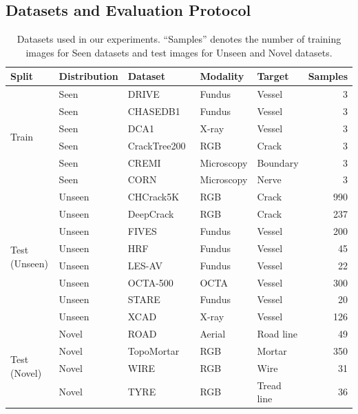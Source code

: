 \subsection{Datasets and Evaluation Protocol}
\label{sec:datasets}

\begin{table}[t]
\centering
\caption{Datasets used in our experiments.  ``Samples'' denotes the number
of training images for Seen datasets and test images for Unseen and Novel
datasets.}
\label{tab:datasets}
\scriptsize
\setlength{\tabcolsep}{2.2pt}
\begin{tabular}{@{}lllllr@{}}
\toprule
Split & Distribution & Dataset & Modality & Target & Samples \\
\midrule
\multirow{6}{*}{Train}
 & Seen & DRIVE~\cite{staal2004drive} & Fundus & Vessel & 3 \\
 & Seen & CHASEDB1~\cite{owen2009chasedb1} & Fundus & Vessel & 3 \\
 & Seen & DCA1~\cite{cervantes2019dca1} & X-ray & Vessel & 3 \\
 & Seen & CrackTree200~\cite{zou2012cracktree} & RGB & Crack & 3 \\
 & Seen & CREMI & Microscopy & Boundary & 3 \\
 & Seen & CORN~\cite{mou2019csnet} & Microscopy & Nerve & 3 \\
\midrule
\multirow{8}{*}{Test (Unseen)}
 & Unseen & CHCrack5K~\cite{chen2025hacnetv2} & RGB & Crack & 990 \\
 & Unseen & DeepCrack~\cite{liu2019deepcrack} & RGB & Crack & 237 \\
 & Unseen & FIVES~\cite{jin2022fives} & Fundus & Vessel & 200 \\
 & Unseen & HRF~\cite{budai2013robust} & Fundus & Vessel & 45 \\
 & Unseen & LES-AV~\cite{orlando2018glaucoma} & Fundus & Vessel & 22 \\
 & Unseen & OCTA-500~\cite{li2024octa500} & OCTA & Vessel & 300 \\
 & Unseen & STARE~\cite{hoover2000stare} & Fundus & Vessel & 20 \\
 & Unseen & XCAD~\cite{ma2021ssvs} & X-ray & Vessel & 126 \\
\midrule
\multirow{4}{*}{Test (Novel)}
 & Novel & ROAD~\cite{mnih2013machine} & Aerial & Road line & 49 \\
 & Novel & TopoMortar~\cite{valverde2025topomortar} & RGB & Mortar & 350 \\
 & Novel & WIRE~\cite{zhu2026sacm} & RGB & Wire & 31 \\
 & Novel & TYRE~\cite{zhu2026sacm} & RGB & Tread line & 36 \\
\bottomrule
\end{tabular}
\end{table}

